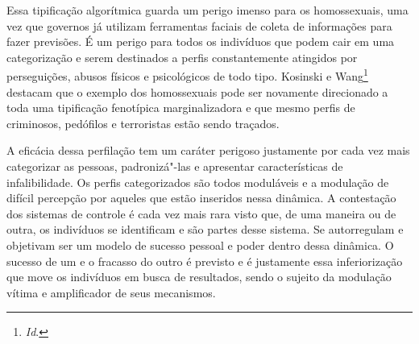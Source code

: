 Essa tipificação algorítmica guarda um perigo imenso para os
homossexuais, uma vez que governos já utilizam ferramentas faciais de
coleta de informações para fazer previsões. É um perigo para todos os
indivíduos que podem cair em uma categorização e serem destinados a
perfis constantemente atingidos por perseguições, abusos físicos e
psicológicos de todo tipo. Kosinski e Wang\footnote{\textit{Id}.} destacam que o exemplo
dos homossexuais pode ser novamente direcionado a toda uma tipificação
fenotípica marginalizadora e que mesmo perfis de criminosos, pedófilos e
terroristas estão sendo traçados.

A eficácia dessa perfilação tem um caráter perigoso justamente por cada
vez mais categorizar as pessoas, padronizá"-las e apresentar
características de infalibilidade. Os perfis categorizados são todos
moduláveis e a modulação de difícil percepção por aqueles que estão
inseridos nessa dinâmica. A contestação dos sistemas de controle é cada
vez mais rara visto que, de uma maneira ou de outra, os indivíduos se
identificam e são partes desse sistema. Se autorregulam e objetivam ser
um modelo de sucesso pessoal e poder dentro dessa dinâmica. O sucesso de
um e o fracasso do outro é previsto e é justamente essa inferiorização
que move os indivíduos em busca de resultados, sendo o sujeito da
modulação vítima e amplificador de seus mecanismos.



